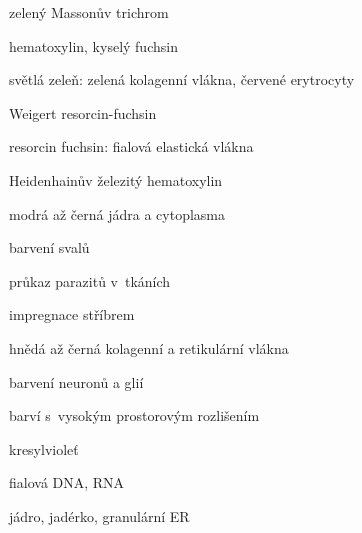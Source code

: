 \documentclass[DIV=8]{scrreprt}
\begin{document}
\begin{myItemize}[nosep]
    \item zelený Massonův trichrom
\begin{myItemize}[nosep]
    \item hematoxylin, kyselý fuchsin
    \item světlá zeleň: zelená kolagenní vlákna, červené erytrocyty
\end{myItemize}

    \item Weigert resorcin-fuchsin
\begin{myItemize}[nosep]
    \item resorcin fuchsin: fialová elastická vlákna
\end{myItemize}

    \item Heidenhainův železitý hematoxylin
\begin{myItemize}[nosep]
    \item modrá až černá jádra a cytoplasma
    \item barvení svalů
    \item průkaz parazitů v tkáních
\end{myItemize}

    \item impregnace stříbrem
\begin{myItemize}[nosep]
    \item hnědá až černá kolagenní a retikulární vlákna
    \item barvení neuronů a glií
    \item barví s vysokým prostorovým rozlišením
\end{myItemize}

    \item kresylvioleť
\begin{myItemize}[nosep]
    \item fialová DNA, RNA
    \item jádro, jadérko, granulární ER
\end{myItemize}

\end{myItemize}
\end{document}
